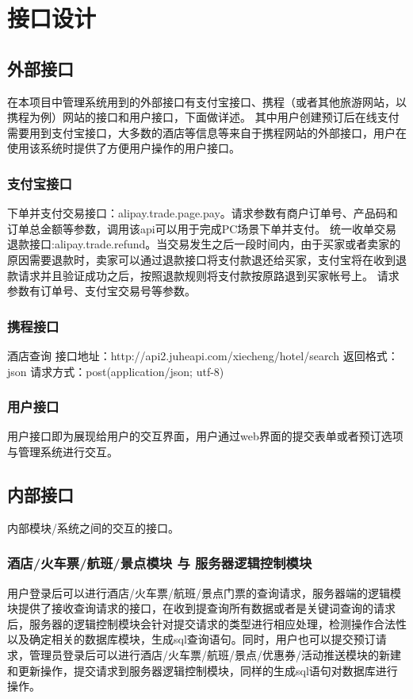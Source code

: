 \chapter{接口设计}
\section{外部接口}
在本项目中管理系统用到的外部接口有支付宝接口、携程（或者其他旅游网站，以携程为例）网站的接口和用户接口，下面做详述。
其中用户创建预订后在线支付需要用到支付宝接口，大多数的酒店等信息等来自于携程网站的外部接口，用户在使用该系统时提供了方便用户操作的用户接口。

\subsection{支付宝接口}
\indent    下单并支付交易接口：alipay.trade.page.pay。请求参数有商户订单号、产品码和订单总金额等参数，调用该api可以用于完成PC场景下单并支付。\newline
\indent    统一收单交易退款接口:alipay.trade.refund。当交易发生之后一段时间内，由于买家或者卖家的原因需要退款时，卖家可以通过退款接口将支付款退还给买家，支付宝将在收到退款请求并且验证成功之后，按照退款规则将支付款按原路退到买家帐号上。 请求参数有订单号、支付宝交易号等参数。
\subsection{携程接口}
\indent    酒店查询 \newline
\indent    接口地址：http://api2.juheapi.com/xiecheng/hotel/search \newline
\indent    返回格式：json \newline
\indent    请求方式：post(application/json; utf-8) \newline

\subsection{用户接口}
用户接口即为展现给用户的交互界面，用户通过web界面的提交表单或者预订选项与管理系统进行交互。

\section{内部接口}
内部模块/系统之间的交互的接口。
\subsection{酒店/火车票/航班/景点模块 与 服务器逻辑控制模块}
用户登录后可以进行酒店/火车票/航班/景点门票的查询请求，服务器端的逻辑模块提供了接收查询请求的接口，在收到提查询所有数据或者是关键词查询的请求后，服务器的逻辑控制模块会针对提交请求的类型进行相应处理，检测操作合法性以及确定相关的数据库模块，生成sql查询语句。同时，用户也可以提交预订请求，管理员登录后可以进行酒店/火车票/航班/景点/优惠券/活动推送模块的新建和更新操作，提交请求到服务器逻辑控制模块，同样的生成sql语句对数据库进行操作。

